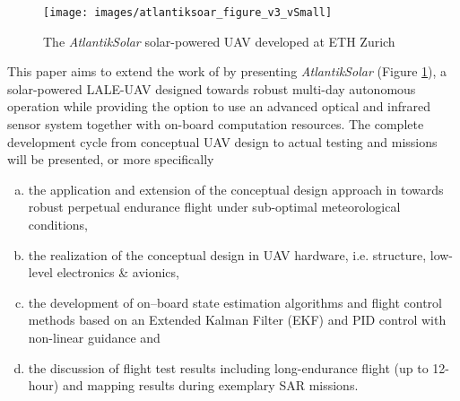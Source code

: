 \begin{figure}[b]
    \centering
    \texttt{[image: images/atlantiksoar\_figure\_v3\_vSmall]}
    \caption{The \textit{AtlantikSolar} solar-powered UAV developed at ETH Zurich}
    \label{fig:AtlantikSolarCollage}
\end{figure}


This paper aims to extend the work of \cite{Cocconi_SoLong,Noth_PhD} by presenting \textit{AtlantikSolar} (Figure \ref{fig:AtlantikSolarCollage}), a solar-powered LALE-UAV designed towards robust multi-day autonomous operation while providing the option to use an advanced optical and infrared sensor system together with on-board computation resources. The complete development cycle from conceptual UAV design to actual testing and missions will be presented, or more specifically
  
 \begin{enumerate}[(a)]
\item the application and extension of the conceptual design approach in \cite{Noth_PhD,Leutenegger_JIRS} towards robust perpetual endurance flight under sub-optimal meteorological conditions, 
\item the realization of the conceptual design in UAV hardware, i.e. structure, low-level electronics \& avionics, 
\item the development of on--board state estimation algorithms and flight control methods based on an Extended Kalman Filter (EKF) and PID control with non-linear guidance and
\item the discussion of flight test results including long-endurance flight (up to 12-hour) and mapping results during exemplary SAR missions.
\end{enumerate}

